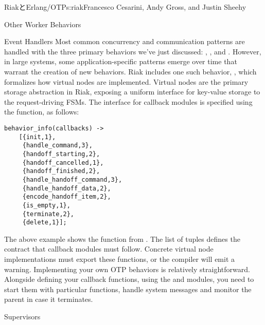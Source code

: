 \begin{aosachapter}{RiakとErlang/OTP}{s:riak}{Francesco Cesarini, Andy Gross, and Justin Sheehy}
\begin{aosasect1}{Other Worker Behaviors}
\begin{aosasect2}{Event Handlers}
Most common concurrency and communication patterns are handled with
the three primary behaviors we've just discussed: ,
, and .  However, in large systems,
some application-specific patterns emerge over time that warrant the
creation of new behaviors.  Riak includes one such behavior,
, which formalizes how virtual nodes are
implemented.  Virtual nodes are the primary storage abstraction in
Riak, exposing a uniform interface for key-value storage to the
request-driving FSMs.  The interface for callback modules is specified
using the  function, as follows:


\begin{verbatim}
behavior_info(callbacks) ->
    [{init,1},
     {handle_command,3},
     {handoff_starting,2},
     {handoff_cancelled,1},
     {handoff_finished,2},
     {handle_handoff_command,3},
     {handle_handoff_data,2},
     {encode_handoff_item,2},
     {is_empty,1},
     {terminate,2},
     {delete,1}];
\end{verbatim}

\noindent The above example shows the  function from
.  The list of  tuples defines the contract that callback modules must
follow.  Concrete virtual node implementations must export these
functions, or the compiler will emit a warning. Implementing your own
OTP behaviors is relatively straightforward. Alongside defining your
callback functions, using the  and  modules,
you need to start them with particular functions, handle system
messages and monitor the parent in case it terminates.

\end{aosasect2}

\end{aosasect1}

\begin{aosasect1}{Supervisors}


\end{aosasect1}
\end{aosachapter}
